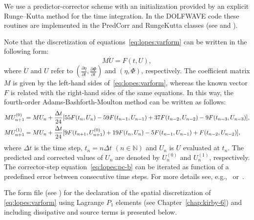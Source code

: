 We use a predictor-corrector  scheme with
an initialization provided by an explicit
Runge--Kutta method for the time integration. In
the DOLFWAVE code these routines are implemented in the PredCorr and
RungeKutta classes (see  and
).

Note that the discretization of equations~\eqref{eq:lopes:varform} can
be written in the following form:
\begin{equation}
  M\dot U=F(t,U),
\end{equation}
where $\dot U$ and $U$ refer to $\displaystyle \left(\frac{\partial
\eta}{\partial t},\frac{\partial \Phi}{\partial t}\right)$ and
$(\eta,\Phi)$, respectively.  The coefficient matrix $M$ is given by
the left-hand sides of~\eqref{eq:lopes:varform}, whereas the known
vector $F$ is related with the right-hand sides of the same equations.
In this way, the fourth-order Adams-Bashforth-Moulton method can be
written as follows:
\begin{subequations}
  \label{eq:lopes:pc}
  \begin{align}
    &\displaystyle MU^{(0)}_{n+1} = MU_n+\frac{\Delta
      t}{24}[55{F}(t_n,U_n) - 59{F}(t_{n-1},U_{n-1}) +
    37{F}(t_{n-2},U_{n-2})-9{F}(t_{n-3},U_{n-3})],
    \label{eq:lopes:pc-a}\\
    \displaystyle
    &MU^{(1)}_{n+1}=MU_n+\frac{\Delta
      t}{24}[9{F}(t_{n+1},U^{(0)}_{n+1}) + 19{F}(t_n,U_n)-
    5{F}(t_{n-1},U_{n-1}) + {F}(t_{n-2},U_{n-2})],
    \label{eq:lopes:pc-b}
  \end{align}
\end{subequations}
where $\Delta t$ is the time step, $t_n=n\Delta t$ $(n\in \mathbb{N})$
and $U_n$ is $U$ evaluated at $t_n$.  The predicted and corrected
values of $U_n$ are denoted by $U_n^{(0)}$ and $U_n^{(1)}$,
respectively.  The corrector-step equation~\eqref{eq:lopes:pc-b} can
be iterated as function of a predefined error between consecutive time
steps.  For more details see, e.g.,~\citet{HairerWanner1991a}
or~\citet{Lambert1991}.

The \ufl form file (see ) for the
declaration of the spatial discretization of \eqref{eq:lopes:varform}
using Lagrange $P_1$ elements (see Chapter~\ref{chap:kirby-6}) and
including dissipative and source terms is presented below.

